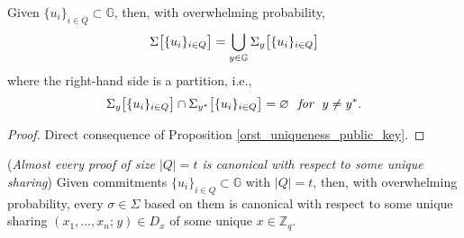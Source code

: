 \documentclass{iacrtrans}
\begin{document}
\begin{cor}\label{orst_validity_classes_prop}
Given $\{u_i\}_{i \in Q} \subset \mathbb{G}$,
then, with overwhelming probability,
\vspace{5pt}
\begin{equation}\label{orst_validity_classes_union}
\Sigma\big[\{u_i\}_{i \in Q}\big]
=
\bigcup_{y \in \mathbb{G}} \Sigma_y\big[\{u_i\}_{i \in Q}\big]
\vspace{3pt}
\end{equation}
where the right-hand side is a partition, i.e.,
\vspace{7pt}
\begin{equation*}
\Sigma_y\big[\{u_i\}_{i \in Q}\big]
\cap
\Sigma_{y^*}\big[\{u_i\}_{i \in Q}\big]
= \varnothing
\ \textit{ for }\ y \neq y^*.
\vspace{7pt}
\end{equation*}
\end{cor}

\begin{proof}
Direct consequence of Proposition \ref{orst_uniqueness_public_key}.
\end{proof}

\begin{prop}\label{orst_uniqueness_sharing}
\textup{(\textit{Almost every proof of size $|Q| = t$
is canonical with respect to some unique sharing})}
Given commitments
$\{u_i\}_{i \in Q} \subset \mathbb{G}$ with $|Q| = t$,
then, with overwhelming probability,
every $\sigma \in \Sigma$ based on them
is canonical with respect to some unique sharing
$(x_1, \dots, x_n;\hspace{1pt} y) \in D_x$
of some unique $x \in \mathbb{Z}_q$.
\end{prop}
\end{document}
